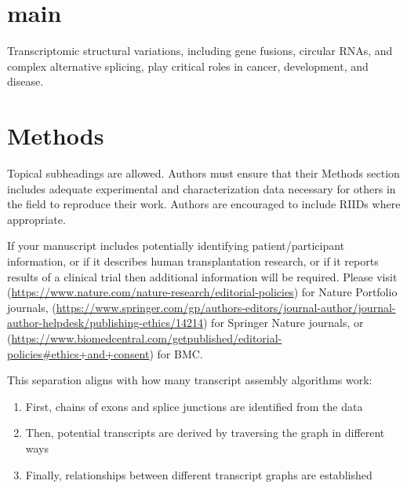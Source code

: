 \documentclass[pdflatex,sn-nature]{sn-jnl}%
\theoremstyle{thmstyleone}%
\theoremstyle{thmstyletwo}%
\theoremstyle{thmstylethree}%
\begin{document}

\maketitle

\section{main}\label{sec1}

Transcriptomic structural variations, including gene fusions, circular RNAs, and complex alternative splicing, play critical roles in cancer, development, and disease.


\section{Methods}\label{sec11}

Topical subheadings are allowed. Authors must ensure that their Methods section includes adequate experimental and characterization data necessary for others in the field to reproduce their work. Authors are encouraged to include RIIDs where appropriate.

If your manuscript includes potentially identifying patient/participant information, or if it describes human transplantation research, or if it reports results of a clinical trial then  additional information will be required. Please visit (\url{https://www.nature.com/nature-research/editorial-policies}) for Nature Portfolio journals, (\url{https://www.springer.com/gp/authors-editors/journal-author/journal-author-helpdesk/publishing-ethics/14214}) for Springer Nature journals, or (\url{https://www.biomedcentral.com/getpublished/editorial-policies\#ethics+and+consent}) for BMC.

\backmatter


This separation aligns with how many transcript assembly algorithms work:

\begin{enumerate}[leftmargin=*]
	\item First, chains of exons and splice junctions are identified from the data
	\item Then, potential transcripts are derived by traversing the graph in different ways
	\item Finally, relationships between different transcript graphs are established
\end{enumerate}
\end{document}
